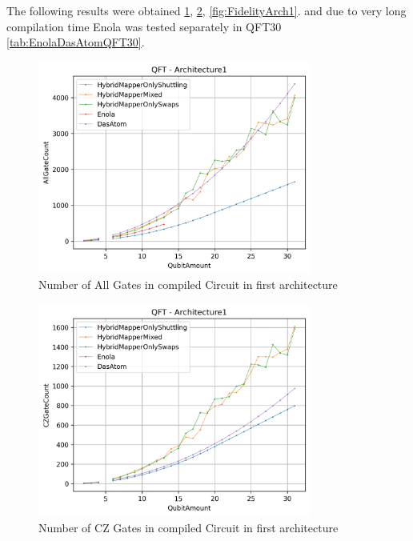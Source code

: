 The following results were obtained \ref{fig:AllGateCountArch1},
\ref{fig:CZGateCountArch1}, \ref{fig:FidelityArch1}. 
and due to very long compilation time Enola was tested separately in \ac{QFT}30 \ref{tab:EnolaDasAtomQFT30}.
\begin{figure}[htbp]
  \centering
    \includegraphics[width=0.8\textwidth]{figures/AllGateCountArch1.png}
    \caption[All Gate Number of first Architecture]{Number of All Gates in compiled Circuit in first architecture}
    \label{fig:AllGateCountArch1}
\end{figure}
\begin{figure}[htbp]
  \centering
    \includegraphics[width=0.8\textwidth]{figures/CZGateCountArch1.png}
    \caption[CZ Gate Number for first Architecture]{Number of CZ Gates in compiled Circuit in first architecture}
    \label{fig:CZGateCountArch1}
\end{figure}
